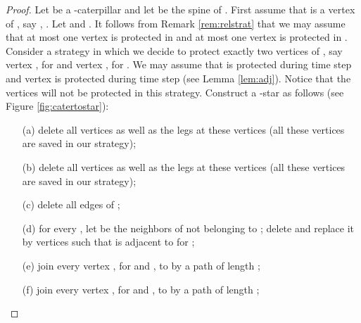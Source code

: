\documentclass[10pt]{article}
\begin{document}
\begin{proof}
Let  be a -caterpillar and let  be the spine of . First assume that  is a vertex of , say , . Let  and . It follows from Remark \ref{rem:relstrat} that we may assume that at most one vertex is protected in  and at most one vertex is protected in . Consider a strategy in which we decide to protect exactly two vertices of , say vertex , for  and vertex , for . We may assume that  is protected during time step  and vertex  is protected during time step  (see Lemma \ref{lem:adj}). Notice that the vertices  will not be protected in this strategy. Construct a -star  as follows (see Figure \ref{fig:catertostar}):

\begin{itemize}
\item[(a)] delete all vertices  as well as the legs at these vertices (all these vertices are saved in our strategy);
\item[(b)] delete all vertices  as well as the legs at these vertices (all these vertices are saved in our strategy);
\item[(c)] delete all edges of ;
\item[(d)] for every , let  be the neighbors of  not belonging to ; delete  and replace it by  vertices  such that  is adjacent to  for ;
\item[(e)] join every vertex , for  and , to  by a path  of length ;
\item[(f)] join every vertex , for  and , to  by a path  of length ;
\end{itemize}

\begin{figure}[!h]
\begin{center}


\end{center}
\end{figure}
\end{proof}
\end{document}
